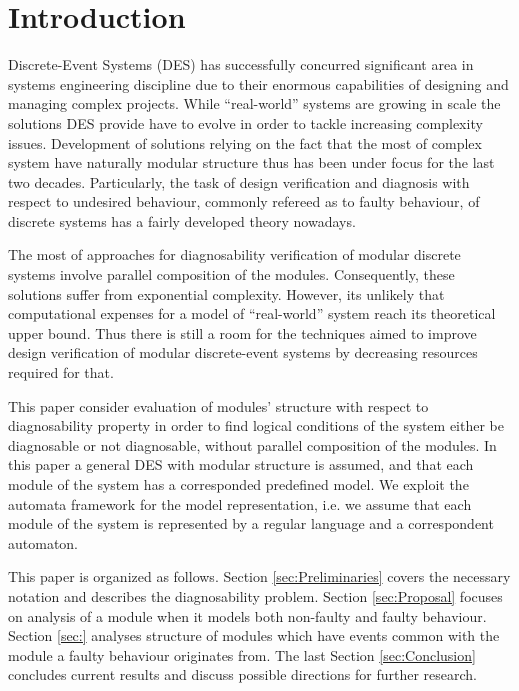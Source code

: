 \documentclass[a4paper, 10pt, conference]{ieeeconf} \IEEEoverridecommandlockouts
\begin{document}
\section{Introduction}
Discrete-Event Systems (DES) has successfully concurred significant area in
systems engineering discipline due to their enormous capabilities of designing
and managing complex projects. While ``real-world'' systems are growing in scale
the solutions DES provide have to evolve in order to tackle increasing
complexity issues. Development of solutions relying on the fact that the most of
complex system have naturally modular structure thus has been under focus for
the last two decades. Particularly, the task of design verification and
diagnosis with respect to undesired behaviour, commonly refereed as to faulty
behaviour, of discrete systems has a fairly developed theory nowadays.

The most of approaches for diagnosability verification of modular discrete
systems involve parallel composition of the modules. Consequently, these
solutions suffer from exponential complexity. However, its unlikely
that computational expenses for a model of ``real-world'' system reach its
theoretical upper bound. Thus there is still a room for the techniques aimed to
improve design verification of modular discrete-event systems by decreasing
resources required for that.

This paper consider evaluation of modules' structure with respect to
diagnosability property in order to find logical conditions of the system either
be diagnosable or not diagnosable, without parallel composition of the modules.
In this paper a general DES with modular structure is assumed, and that each
module of the system has a corresponded predefined model.
We exploit the automata framework for the model representation, i.e. we assume
that each module of the system is represented by a regular language and a
correspondent automaton.

This paper is organized as follows. Section \ref{sec:Preliminaries} covers the
necessary notation and describes the diagnosability problem. Section
\ref{sec:Proposal} focuses on analysis of a module when it models both
non-faulty and faulty behaviour. Section \ref{sec:} analyses structure of
modules which have events common with the module a faulty behaviour originates
from. The last Section \ref{sec:Conclusion} concludes current results and
discuss possible directions for further research.
\end{document}
